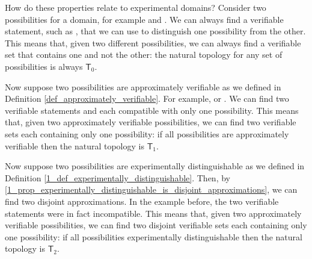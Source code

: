 \documentclass[11pt,letterpaper,fleqn]{memoir} %
\begin{document}
How do these properties relate to experimental domains? Consider two possibilities for a domain, for example  and . We can always find a verifiable statement, such as , that we can use to distinguish one possibility from the other. This means that, given two different possibilities, we can always find a verifiable set that contains one and not the other: the natural topology for any set of possibilities is always $\mathsf{T}_0$.

Now suppose two possibilities are approximately verifiable as we defined in Definition \ref{def_approximately_verifiable}. For example,  or . We can find two verifiable statements  and  each compatible with only one possibility. This means that, given two approximately verifiable possibilities, we can find two verifiable sets each containing only one possibility: if all possibilities are approximately verifiable then the natural topology is $\mathsf{T}_1$.

Now suppose two possibilities are experimentally distinguishable as we defined in Definition \ref{1_def_experimentally_distinguishable}. Then, by \ref{1_prop_experimentally_distinguishable_is_disjoint_approximations}, we can find two disjoint approximations. In the example before, the two verifiable statements were in fact incompatible. This means that, given two approximately verifiable possibilities, we can find two disjoint verifiable sets each containing only one possibility: if all possibilities experimentally distinguishable then the natural topology is $\mathsf{T}_2$.
\end{document}
